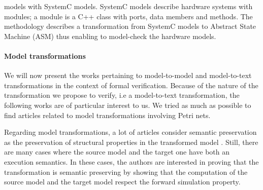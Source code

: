 \documentclass[pdflatex,sn-mathphys]{sn-jnl}%
\theoremstyle{thmstyleone}%
\theoremstyle{thmstyletwo}%
\theoremstyle{thmstylethree}%
\begin{document}
models with SystemC models. SystemC models describe hardware systems
with modules; a module is a C++ class with ports, data members and
methods. The methodology describes a transformation from SystemC
models to Abstract State Machine (ASM) thus enabling to model-check
the hardware models. %

\paragraph{Model transformations}


We will now present the works pertaining to model-to-model and
model-to-text transformations in the context of formal
verification. Because of the nature of the transformation we propose
to verify, i.e a model-to-text transformation, the following works are
of particular interest to us.  We tried as much as possible to find
articles related to model transformations involving Petri nets.

Regarding model transformations, a lot of articles consider semantic
preservation as the preservation of structural properties in the
transformed model
\cite{Berramla2015,Calegari2011,Meghzili2017}. Still, there are many
cases where the source model and the target one have both an execution
semantics. In these cases, the authors are interested in proving that
the transformation is semantic preserving by showing that the
computation of the source model and the target model respect the
forward simulation property.
\end{document}
